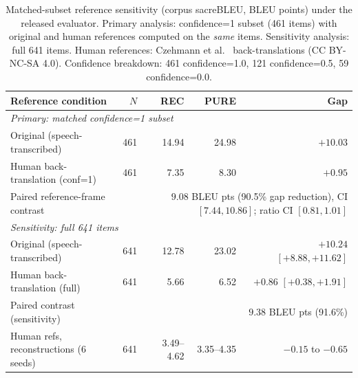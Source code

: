 \documentclass[pdflatex,sn-chicago]{sn-jnl}
\begin{document}
\begin{table}[h]
\centering
\scriptsize
\caption{Matched-subset reference sensitivity (corpus sacreBLEU, BLEU points) under the released evaluator. Primary analysis: confidence=1 subset (461 items) with original and human references computed on the \emph{same} items. Sensitivity analysis: full 641 items. Human references: Czehmann et al.~\cite{czehmann2026sacred} back-translations (CC BY-NC-SA 4.0). Confidence breakdown: 461 confidence=1.0, 121 confidence=0.5, 59 confidence=0.0.}
\label{tab:s10_ref_sensitivity}
\begin{tabular}{lrrrr}
\toprule
Reference condition & $N$ & REC & PURE & Gap \\
\midrule
\multicolumn{5}{l}{\emph{Primary: matched confidence=1 subset}} \\
Original (speech-transcribed) & 461 & 14.94 & 24.98 & $+10.03$ \\
Human back-translation (conf=1) & 461 & 7.35 & 8.30 & $+0.95$ \\
Paired reference-frame contrast & \multicolumn{4}{r}{$9.08$ BLEU pts (90.5\% gap reduction), CI $[7.44, 10.86]$; ratio CI $[0.81, 1.01]$} \\
\midrule
\multicolumn{5}{l}{\emph{Sensitivity: full 641 items}} \\
Original (speech-transcribed) & 641 & 12.78 & 23.02 & $+10.24$ $[+8.88,+11.62]$ \\
Human back-translation (full) & 641 & 5.66 & 6.52 & $+0.86$ $[+0.38,+1.91]$ \\
Paired contrast (sensitivity) & \multicolumn{4}{r}{$9.38$ BLEU pts (91.6\%)} \\
\midrule
Human refs, reconstructions (6 seeds) & 641 & 3.49--4.62 & 3.35--4.35 & $-0.15$ to $-0.65$ \\
\bottomrule
\end{tabular}
\end{table}
\end{document}
